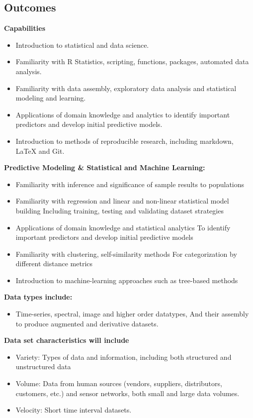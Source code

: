 \documentclass[11pt]{article} %
\begin{document}
  \subsection{Outcomes}
  
    {\bf Capabilities}
      \begin{itemize}
      	\item Introduction to statistical and data science. 
      	\item Familiarity with R Statistics, scripting, functions, packages, automated data analysis. 
      	\item Familiarity with data assembly, exploratory data analysis and statistical modeling and learning. 
      	\item Applications of domain knowledge and analytics to identify important predictors and develop initial predictive models. 
      	\item Introduction to methods of reproducible research, including markdown, LaTeX and Git. 
      \end{itemize}
    
    {\bf Predictive Modeling \& Statistical and Machine Learning:}
      \begin{itemize}
      	\item Familiarity with inference and significance of sample results to populations 
      	\item Familiarity with regression and linear and non-linear statistical model building
      		\subitem Including training, testing and validating dataset strategies
      	\item Applications of domain knowledge and statistical analytics 
      		\subitem To identify important predictors and develop initial predictive models
      	\item Familiarity with clustering, self-similarity methods 
      		\subitem For categorization by different distance metrics
      	\item Introduction to machine-learning approaches such as tree-based methods
      \end{itemize}
    
    {\bf Data types include:}
      \begin{itemize}
      	\item Time-series, spectral, image and higher order datatypes, 
      	\subitem And their assembly to produce augmented and derivative datasets. 
      \end{itemize}
    
    {\bf Data set characteristics will include}
      \begin{itemize}
      	\item Variety: Types of data and information, including both structured and unstructured data 
      	\item Volume: Data from human sources (vendors, suppliers, distributors, customers, etc.) and sensor networks,  both small and large data volumes. 
      	\item Velocity: Short time interval datasets. 
      \end{itemize}
  
\end{document}

